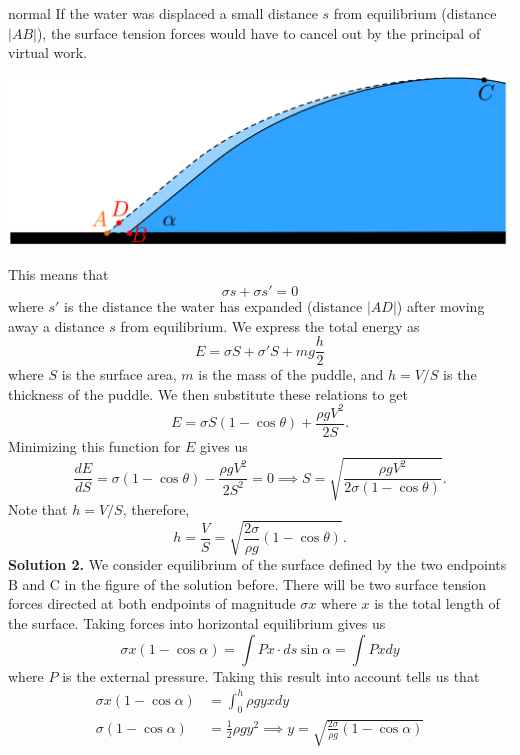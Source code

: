 \begin{solution}{normal}
If the water was displaced a small distance $s$ from equilibrium (distance $|AB|$), the surface tension forces would have to cancel out by the principal of virtual work.
\begin{center}
\includegraphics[width=15cm]{pool.png}
\end{center}
This means that 
\[\sigma s + \sigma s' = 0\]
where $s'$ is the distance the water has expanded (distance $|AD|$) after moving away a distance $s$ from equilibrium. We express the total energy as 
\[E = \sigma S + \sigma' S + mg\frac{h}{2}\]
where $S$ is the surface area, $m$ is the mass of the puddle, and $h = V/S$ is the thickness of the puddle. We then substitute these relations to get 
\[E = \sigma S(1 - \cos\theta) + \frac{\rho g V^2}{2S}.\]
Minimizing this function for $E$ gives us 
\[\frac{dE}{dS} = \sigma (1 -\cos\theta) - \frac{\rho gV^2}{2S^2} = 0\implies S = \sqrt{\frac{\rho gV^2}{2\sigma (1 - \cos\theta)}}.\]
Note that $h = V/S$, therefore, 
\[h = \frac{V}{S} = \boxed{\sqrt{\frac{2\sigma}{\rho g} (1 -\cos\theta)}}.\]
\tcbline 
\textbf{Solution 2.} We consider equilibrium of the surface defined by the two endpoints $\text{B}$ and $\text{C}$ in the figure of the solution before. There will be two surface tension forces directed at both endpoints of magnitude $\sigma x$ where $x$ is the total length of the surface. Taking forces into horizontal equilibrium gives us 
\[\sigma x (1 - \cos\alpha) = \int P x \cdot ds\sin\alpha = \int Pxdy\]
where $P$ is the external pressure.  Taking this result into account tells us that 
\begin{align*}
\sigma x (1-\cos\alpha) &= \int_{0}^{h} \rho gy xdy\\
\sigma (1-\cos\alpha) &= \frac{1}{2}\rho gy^2\implies y = \boxed{\sqrt{\frac{2\sigma}{\rho g} (1 -\cos\alpha)}}
\end{align*}
\end{solution}